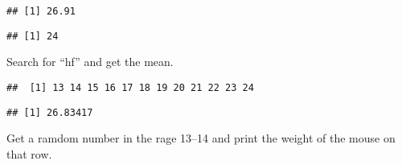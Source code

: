 \begin{Shaded}
\begin{Highlighting}[]
\OperatorTok{$}\NormalTok{Bodyweight[}\NormalTok{]}
\end{Highlighting}
\end{Shaded}

\begin{verbatim}
## [1] 26.91
\end{verbatim}

\begin{Shaded}
\begin{Highlighting}[]
\OperatorTok{$}
\end{Highlighting}
\end{Shaded}

\begin{verbatim}
## [1] 24
\end{verbatim}

Search for ``hf'' and get the mean.

\begin{Shaded}
\begin{Highlighting}[]
\NormalTok{(}\OperatorTok{$}
\end{Highlighting}
\end{Shaded}

\begin{verbatim}
##  [1] 13 14 15 16 17 18 19 20 21 22 23 24
\end{verbatim}

\begin{Shaded}
\begin{Highlighting}[]
\OperatorTok{$}\NormalTok{Bodyweight[}\OperatorTok{:}\NormalTok{])}
\end{Highlighting}
\end{Shaded}

\begin{verbatim}
## [1] 26.83417
\end{verbatim}

Get a ramdom number in the rage 13--14 and print the weight of the mouse
on that row.

\begin{Shaded}
\begin{Highlighting}[]
\StringTok{ }\OperatorTok{:}
\NormalTok{(}\NormalTok{)}
\NormalTok{)}
\end{Highlighting}
\end{Shaded}

